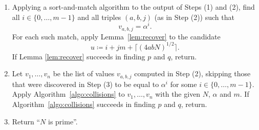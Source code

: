 \documentclass[reqno]{amsart}
\theoremstyle{remark}
\numberwithin{equation}{section}
\numberwithin{thm}{section}
\newcommand{\defeq}{\coloneqq}
\begin{document}
\begin{myalgorithm}[ht]
\begin{enumerate}[label=\arabic*),labelwidth=0.7cm,leftmargin=\labelwidth,itemsep=0.2em]
  \item
  Applying a sort-and-match algorithm to the output of Steps (1) and (2),
  find all $i \in \{0, \ldots, m-1\}$ and all triples $(a,b,j)$
  (as in Step (2)) such that
  \begin{equation}
    \label{eq:congruence-N}
    v_{a,b,j} = \alpha^i.
  \end{equation}
  For each such match, apply Lemma~\ref{lem:recover} to the candidate
    \[ u \defeq i + jm + \lceil(4abN)^{1/2}\rceil. \]
  If Lemma \ref{lem:recover} succeeds in finding $p$ and $q$, return.
  
  \item
  Let $v_1, \ldots, v_n$ be the list of values $v_{a,b,j}$
  computed in Step (2), skipping those that were discovered in Step (3)
  to be equal to $\alpha^i$ for some $i \in \{0, \ldots, m-1\}$.
  Apply Algorithm~\ref{algo:collisions} to $v_1, \ldots, v_n$ with
  the given $N$, $\alpha$ and $m$.
  If Algorithm~\ref{algo:collisions} succeeds in finding $p$ and $q$, return.
  
  \item
  Return ``$N$ is prime''.
\end{enumerate}
\end{myalgorithm}
\end{document}
